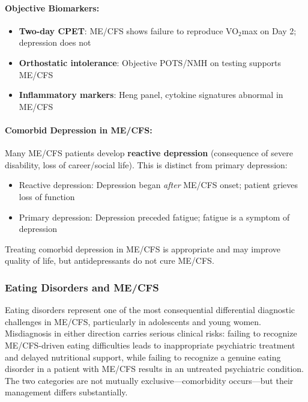 \begin{observation}
\paragraph{Objective Biomarkers:}
\begin{itemize}
    \item \textbf{Two-day CPET}: ME/CFS shows failure to reproduce VO$_2$max on Day 2; depression does not
    \item \textbf{Orthostatic intolerance}: Objective POTS/NMH on testing supports ME/CFS
    \item \textbf{Inflammatory markers}: Heng panel, cytokine signatures abnormal in ME/CFS
\end{itemize}

\paragraph{Comorbid Depression in ME/CFS:}
Many ME/CFS patients develop \textbf{reactive depression} (consequence of severe disability, loss of career/social life). This is distinct from primary depression:
\begin{itemize}
    \item Reactive depression: Depression began \textit{after} ME/CFS onset; patient grieves loss of function
    \item Primary depression: Depression preceded fatigue; fatigue is a symptom of depression
\end{itemize}

Treating comorbid depression in ME/CFS is appropriate and may improve quality of life, but antidepressants do not cure ME/CFS.
\end{observation}

\subsubsection{Eating Disorders and ME/CFS}
\label{subsubsec:eating-disorders-differential}

Eating disorders represent one of the most consequential differential diagnostic challenges in ME/CFS, particularly in adolescents and young women. Misdiagnosis in either direction carries serious clinical risks: failing to recognize ME/CFS-driven eating difficulties leads to inappropriate psychiatric treatment and delayed nutritional support, while failing to recognize a genuine eating disorder in a patient with ME/CFS results in an untreated psychiatric condition. The two categories are not mutually exclusive---comorbidity occurs---but their management differs substantially.

